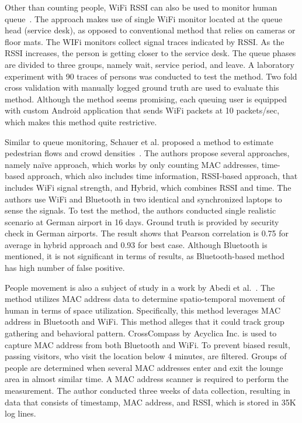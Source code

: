 	Other than counting people, WiFi \ac{RSSI} can also be used to monitor human queue~\cite{thesis012}. The approach makes use of single WiFi monitor located at the queue head (service desk), as opposed to conventional method that relies on cameras or floor mats. The WIFi monitors collect signal traces indicated by \ac{RSSI}. As the \ac{RSSI} increases, the person is getting closer to the service desk. The queue phases are divided to three groups, namely wait, service period, and leave. A laboratory experiment with 90 traces of persons was conducted to test the method. Two fold cross validation with manually logged ground truth are used to evaluate this method. Although the method seems promising, each queuing user is equipped with custom Android application that sends WiFi packets at 10 packets/sec, which makes this method quite restrictive.

	Similar to queue monitoring, Schauer et al. proposed a method to estimate pedestrian flows and crowd densities~\cite{thesis011}. The authors propose several approaches, namely na\"{i}ve approach, which works by only counting MAC addresses, time-based approach, which also includes time information, \ac{RSSI}-based approach, that includes WiFi signal strength, and Hybrid, which combines \ac{RSSI} and time. The authors use WiFi and Bluetooth in two identical and synchronized laptops to sense the signals. To test the method, the authors conducted single realistic scenario at German airport in 16 days.
	Ground truth is provided by security check in German airports. The result shows that Pearson correlation is 0.75 for average in hybrid approach and 0.93 for best case. Although Bluetooth is mentioned, it is not significant in terms of results, as Bluetooth-based method has high number of false positive. 

	People movement is also a subject of study in a work by Abedi et al.~\cite{thesis017}. The method utilizes \ac{MAC} address data to determine spatio-temporal movement of human in terms of space utilization. Specifically, this method leverages \ac{MAC} address in Bluetooth and WiFi. This method alleges that it could track group gathering and behavioral pattern. CrossCompass by Acyclica Inc. is used to capture \ac{MAC} address from both Bluetooth and WiFi. To prevent biased result, passing visitors, who visit the location below 4 minutes, are filtered. Groups of people are determined when several \ac{MAC} addresses enter and exit the lounge area in almost similar time. A \ac{MAC} address scanner is required to perform the measurement. The author conducted three weeks of data collection, resulting in data that consists of timestamp, \ac{MAC} address, and \ac{RSSI}, which is stored in 35K log lines.


